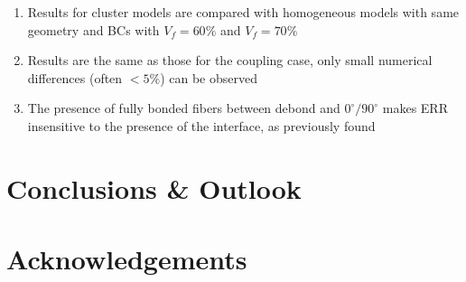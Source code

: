 \documentclass[review]{elsarticle}
\begin{document}
\begin{enumerate}
\item Results for cluster models are compared with homogeneous models with same geometry and BCs with $V_{f}=60\%$ and $V_{f}=70\%$
\item Results are the same as those for the coupling case, only small numerical differences (often $<5\%$) can be observed
\item The presence of fully bonded fibers between debond and $0^{\circ}/90^{\circ}$ makes ERR insensitive to the presence of the interface, as previously found
\end{enumerate}

\section{Conclusions \& Outlook}




\section*{Acknowledgements}




\end{document}

